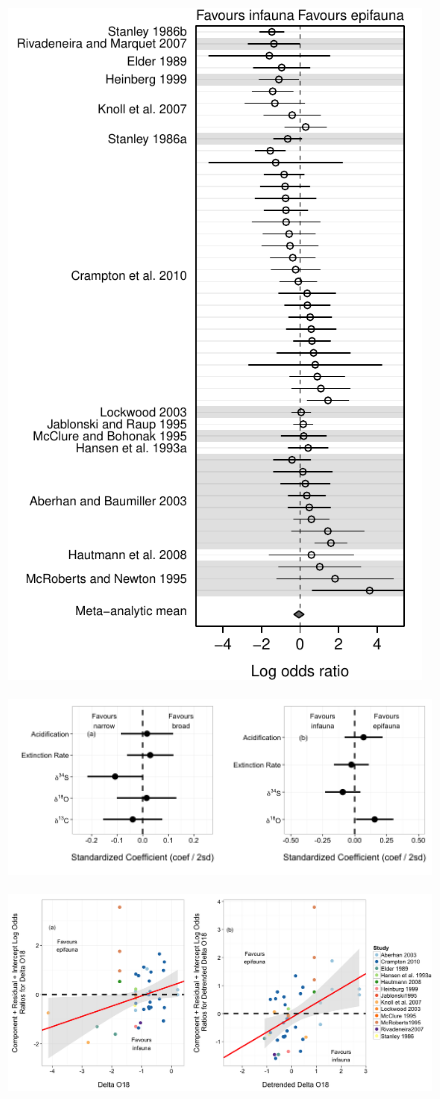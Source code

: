 \documentclass[12pt]{article}
\begin{document}
\begin{figure}[htbp]
  \centering
  \includegraphics[height=7in]{inf_epi_rma.pdf}
  \caption{}
\end{figure}
\clearpage

\begin{figure}[htbp]
  \centering
  \includegraphics[width=\textwidth]{Fig4-1.png}
  \caption{}
\end{figure}
\clearpage

\begin{figure}[htbp]
  \centering
  \includegraphics[width=\textwidth]{Fig5-1.png}
  \caption{}
\end{figure}
\end{document}
